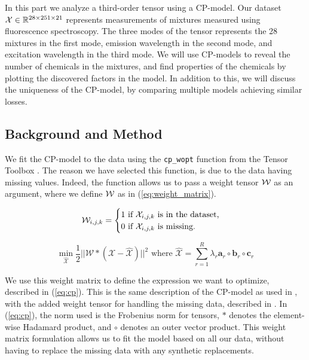 In this part we analyze a third-order tensor using a CP-model.
Our dataset $\mathcal{X}\in \mathbb{R}^{28 \times 251 \times 21}$ represents measurements of mixtures measured using fluorescence spectroscopy.
The three modes of the tensor represents the 28 mixtures in the first mode, emission wavelength in the second mode, and excitation wavelength in the third mode.
We will use CP-models to reveal the number of chemicals in the mixtures, and find properties of the chemicals by plotting the discovered factors in the model.
In addition to this, we will discuss the uniqueness of the CP-model, by comparing multiple models achieving similar losses.


\subsection*{Background and Method}

We fit the CP-model to the data using the \texttt{cp\_wopt} function from the Tensor Toolbox \cite{tentool}.
The reason we have selected this function, is due to the data having missing values.
Indeed, the function allows us to pass a weight tensor $\mathcal{W}$ as an argument, where we define $\mathcal{W}$ as in (\ref{eq:weight_matrix}).


\begin{equation}
\mathcal{W}_{i,j,k} = \begin{cases}
    1 \ \text{if} \ \mathcal{X}_{i,j,k} \ \text{is in the dataset,} \\
    0 \ \text{if} \ \mathcal{X}_{i,j,k} \ \text{is missing.}
\end{cases}
\label{eq:weight_matrix}
\end{equation}

\begin{equation}
    \min_{ \mathcal{\hat{X}}} \frac{1}{2} ||\mathcal{W} * (\mathcal{X} - \mathcal{\hat{X}})||^2 \text{  where } \mathcal{\hat{X}} = \sum_{r = 1}^{R} \lambda_r \mathbf{a}_r \circ \mathbf{b}_r \circ \mathbf{c}_r
    \label{eq:cp}
\end{equation}

We use this weight matrix to define the expression we want to optimize, described in (\ref{eq:cp}).
This is the same description of the CP-model as used in \textcite{tensor-review}, with the added weight tensor for handling the missing data, described in \textcite{cp-wopt}.
In (\ref{eq:cp}), the norm used is the Frobenius norm for tensors, $*$ denotes the element-wise Hadamard product, and $\circ$ denotes an outer vector product.
This weight matrix formulation allows us to fit the model based on all our data, without having to replace the missing data with any synthetic replacements.

